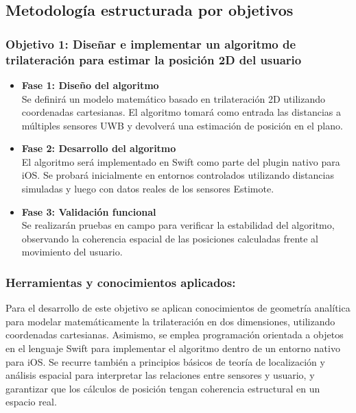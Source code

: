 \documentclass{article}
\begin{document}
\subsection{Metodología estructurada por objetivos}

\subsubsection{Objetivo 1: Diseñar e implementar un algoritmo de trilateración para estimar la posición 2D del usuario}


\begin{itemize}
    \item \textbf{Fase 1: Diseño del algoritmo} \\
    Se definirá un modelo matemático basado en trilateración 2D utilizando coordenadas cartesianas. El algoritmo tomará como entrada las distancias a múltiples sensores UWB y devolverá una estimación de posición en el plano.

    \item \textbf{Fase 2: Desarrollo del algoritmo} \\
    El algoritmo será implementado en Swift como parte del plugin nativo para iOS. Se probará inicialmente en entornos controlados utilizando distancias simuladas y luego con datos reales de los sensores Estimote.

    \item \textbf{Fase 3: Validación funcional} \\
    Se realizarán pruebas en campo para verificar la estabilidad del algoritmo, observando la coherencia espacial de las posiciones calculadas frente al movimiento del usuario.
\end{itemize}

\subsubsection{Herramientas y conocimientos aplicados:} Para el desarrollo de este objetivo se aplican {\justify conocimientos de geometría analítica para modelar matemáticamente la trilateración en dos dimensiones, utilizando coordenadas cartesianas. Asimismo, se emplea programación orientada a objetos en el lenguaje Swift para implementar el algoritmo dentro de un entorno nativo para iOS. Se recurre también a principios básicos de teoría de localización y análisis espacial para interpretar las relaciones entre sensores y usuario, y garantizar que los cálculos de posición tengan coherencia estructural en un espacio real.}
\end{document}
